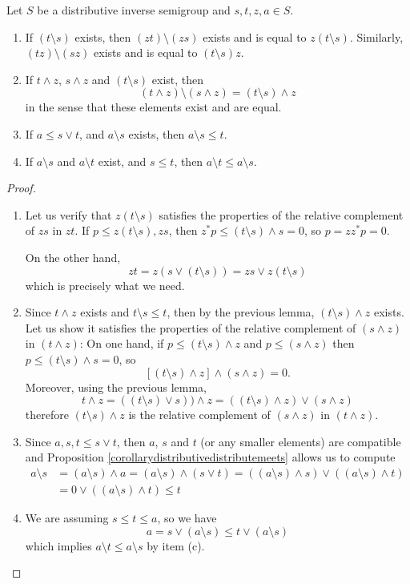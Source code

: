\begin{proposition}\label{propositionrelativecomplementsandoperations}
Let $S$ be a distributive inverse semigroup and $s,t,z,a\in S$.
\begin{enumerate}
\item[(a)] If $(t\setminus s)$ exists, then $(zt)\setminus(zs)$ exists and is equal to $z(t\setminus s)$. Similarly, $(tz)\setminus(sz)$ exists and is equal to $(t\setminus s)z$.
\item[(b)] If $t\land z$, $s\land z$ and $(t\setminus s)$ exist, then
\[(t\land z)\setminus(s\land z)=(t\setminus s)\land z\]%
in the sense that these elements exist and are equal.
\item[(c)] If $a\leq s\lor t$, and $a\setminus s$ exists, then $a\setminus s\leq t$.
\item[(d)] If $a\setminus s$ and $a\setminus t$ exist, and $s\leq t$, then $a\setminus t\leq a\setminus s$.
\end{enumerate}
\end{proposition}
\begin{proof}
\begin{enumerate}
\item[(a)] Let us verify that $z(t\setminus s)$ satisfies the properties of the relative complement of $zs$ in $zt$. If $p\leq z(t\setminus s),zs$, then $z^*p\leq (t\setminus s)\land s=0$, so $p=zz^*p=0$.

On the other hand,
\[zt=z(s\lor(t\setminus s))=zs\lor z(t\setminus s)\]
which is precisely what we need.
\item[(b)] Since $t\land z$ exists and $t\setminus s\leq t$, then by the previous lemma, $(t\setminus s)\land z$ exists. Let us show it satisfies the properties of the relative complement of $(s\land z)$ in $(t\land z)$: On one hand, if $p\leq (t\setminus s)\land z$ and $p\leq (s\land z)$ then $p\leq (t\setminus s)\land s=0$, so
\[\left[(t\setminus s)\land z\right]\land (s\land z)=0.\]
Moreover, using the previous lemma,
\[t\land z=((t\setminus s)\lor s))\land z=((t\setminus s)\land z)\lor(s\land z)\]
therefore $(t\setminus s)\land z$ is the relative complement of $(s\land z)$ in $(t\land z)$.%
\item[(c)] Since $a,s,t\leq s\lor t$, then $a$, $s$ and $t$ (or any smaller elements) are compatible and Proposition \ref{corollarydistributivedistributemeets} allows us to compute
\begin{align*}
a\setminus s&=(a\setminus s)\land a=(a\setminus s)\land(s\lor t)=((a\setminus s)\land s)\lor((a\setminus s)\land t)\\
&=0\lor((a\setminus s)\land t)\leq t
\end{align*}
\item[(d)] We are assuming $s\leq t\leq a$, so we have
\[a= s\lor(a\setminus s)\leq t\lor(a\setminus s)\]
which implies $a\setminus t\leq a\setminus s$ by item (c).\qedhere
\end{enumerate}
\end{proof}
%